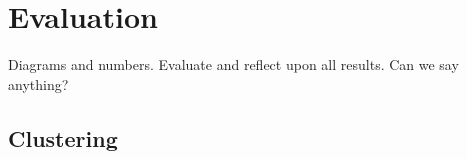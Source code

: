 \section{Evaluation}
\label{sec:evaluation}
Diagrams and numbers. Evaluate and reflect upon all results. Can we say anything?

\subsection{Clustering}
\label{subsec:clustering}